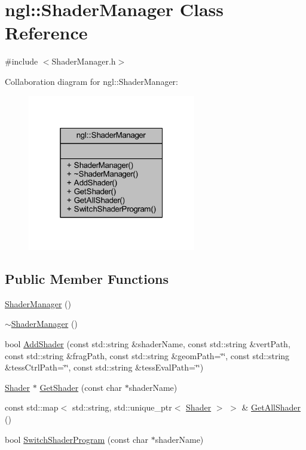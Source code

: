 \hypertarget{classngl_1_1_shader_manager}{}\section{ngl\+:\+:Shader\+Manager Class Reference}
\label{classngl_1_1_shader_manager}


{\ttfamily \#include $<$Shader\+Manager.\+h$>$}



Collaboration diagram for ngl\+:\+:Shader\+Manager\+:
\nopagebreak
\begin{figure}[H]
\begin{center}
\leavevmode
\includegraphics[width=208pt]{classngl_1_1_shader_manager__coll__graph}
\end{center}
\end{figure}
\subsection*{Public Member Functions}
\begin{DoxyCompactItemize}
\item 
\mbox{\hyperlink{classngl_1_1_shader_manager_aca25f81fd10a02b3e97e9c459b864186}{Shader\+Manager}} ()
\item 
\mbox{\hyperlink{classngl_1_1_shader_manager_a7603399f16432b94223b9fa78f74fb87}{$\sim$\+Shader\+Manager}} ()
\item 
bool \mbox{\hyperlink{classngl_1_1_shader_manager_ab44df7caa233d5a797211ed852c7728a}{Add\+Shader}} (const std\+::string \&shader\+Name, const std\+::string \&vert\+Path, const std\+::string \&frag\+Path, const std\+::string \&geom\+Path=\char`\"{}\char`\"{}, const std\+::string \&tess\+Ctrl\+Path=\char`\"{}\char`\"{}, const std\+::string \&tess\+Eval\+Path=\char`\"{}\char`\"{})
\item 
\mbox{\hyperlink{classngl_1_1_shader}{Shader}} $\ast$ \mbox{\hyperlink{classngl_1_1_shader_manager_a49683cb281bbc3e3fa86cccc6ba081ed}{Get\+Shader}} (const char $\ast$shader\+Name)
\item 
const std\+::map$<$ std\+::string, std\+::unique\+\_\+ptr$<$ \mbox{\hyperlink{classngl_1_1_shader}{Shader}} $>$ $>$ \& \mbox{\hyperlink{classngl_1_1_shader_manager_a27db6fcf60854158dc8e8ab6bab98999}{Get\+All\+Shader}} ()
\item 
bool \mbox{\hyperlink{classngl_1_1_shader_manager_a54765d52e0c26eea3677037a291252ea}{Switch\+Shader\+Program}} (const char $\ast$shader\+Name)
\end{DoxyCompactItemize}


